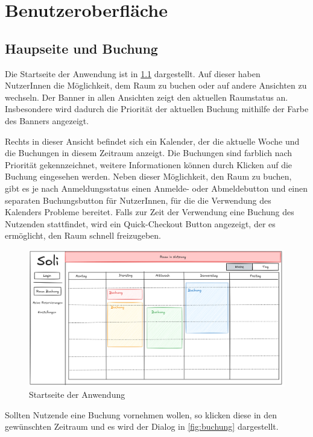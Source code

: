 
\chapter{Benutzeroberfläche}
\label{chap:ui}

\section{Haupseite und Buchung}

Die Startseite der Anwendung ist in \ref{fig:startseite} dargestellt.
Auf dieser haben NutzerInnen die Möglichkeit, dem Raum zu buchen oder auf andere Ansichten zu wechseln.
Der Banner in allen Ansichten zeigt den aktuellen Raumstatus an.
Insbesondere wird dadurch die Priorität der aktuellen Buchung mithilfe der Farbe des Banners angezeigt.

Rechts in dieser Ansicht befindet sich ein Kalender, der die aktuelle Woche und die Buchungen in diesem Zeitraum anzeigt.
Die Buchungen sind farblich nach Priorität gekennzeichnet, weitere Informationen können durch Klicken auf die Buchung eingesehen werden.
Neben dieser Möglichkeit, den Raum zu buchen, gibt es je nach Anmeldungsstatus einen Anmelde- oder Abmeldebutton und einen separaten Buchungsbutton für NutzerInnen,
für die die Verwendung des Kalenders Probleme bereitet.
Falls zur Zeit der Verwendung eine Buchung des Nutzenden stattfindet, wird ein Quick-Checkout Button angezeigt,
der es ermöglicht, den Raum schnell freizugeben.
\begin{figure}[ht]
    \centering
    \includegraphics[scale=0.15]{figures/ui/startseite}
    \caption{Startseite der Anwendung}
    \label{fig:startseite}
\end{figure}
\clearpage

Sollten Nutzende eine Buchung vornehmen wollen, so klicken diese in den gewünschten Zeitraum
und es wird der Dialog in \ref{fig:buchung} dargestellt.

